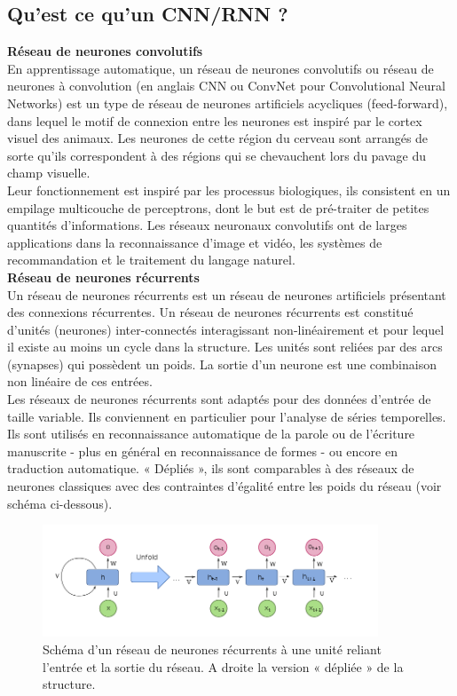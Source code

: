 \subsection{Qu'est ce qu'un CNN/RNN ?}
\textbf{Réseau de neurones convolutifs}\\[0.5cm]
En apprentissage automatique, un réseau de neurones convolutifs ou réseau de neurones à convolution (en anglais CNN ou ConvNet pour Convolutional Neural Networks) est un type de réseau de neurones artificiels acycliques (feed-forward), dans lequel le motif de connexion entre les neurones est inspiré par le cortex visuel des animaux. Les neurones de cette région du cerveau sont arrangés de sorte qu'ils correspondent à des régions qui se chevauchent lors du pavage du champ visuelle.\\[0.2cm]
 Leur fonctionnement est inspiré par les processus biologiques, ils consistent en un empilage multicouche de perceptrons, dont le but est de pré-traiter de petites quantités d'informations. Les réseaux neuronaux convolutifs ont de larges applications dans la reconnaissance d'image et vidéo, les systèmes de recommandation et le traitement du langage naturel.\\[0.5cm]
 \textbf{Réseau de neurones récurrents}\\[0.5cm]
 Un réseau de neurones récurrents est un réseau de neurones artificiels présentant des connexions récurrentes. Un réseau de neurones récurrents est constitué d'unités (neurones) inter-connectés interagissant non-linéairement et pour lequel il existe au moins un cycle dans la structure. Les unités sont reliées par des arcs (synapses) qui possèdent un poids. La sortie d'un neurone est une combinaison non linéaire de ces entrées.\\[0.2cm]
Les réseaux de neurones récurrents sont adaptés pour des données d'entrée de taille variable. Ils conviennent en particulier pour l'analyse de séries temporelles. Ils sont utilisés en reconnaissance automatique de la parole ou de l'écriture manuscrite - plus en général en reconnaissance de formes - ou encore en traduction automatique. « Dépliés », ils sont comparables à des réseaux de neurones classiques avec des contraintes d'égalité entre les poids du réseau (voir schéma ci-dessous).

\begin{figure}[H]
	\begin{center}
	\includegraphics[width=100mm,scale=0.5]{Images/rnn.png}
	\end{center}
	\caption{Schéma d'un réseau de neurones récurrents à une unité reliant l'entrée et la sortie du réseau. A droite la version « dépliée » de la structure.}
	\label{fig:rnn}
\end{figure}


